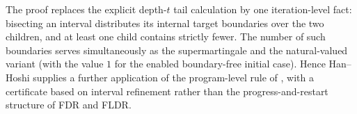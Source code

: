 The proof replaces the explicit depth-$t$ tail calculation by one
iteration-level fact: bisecting an interval distributes its internal
target boundaries over the two children, and at least one child contains
strictly fewer.  The number of such boundaries serves simultaneously as
the supermartingale and the natural-valued variant (with the value $1$
for the enabled boundary-free initial case).  Hence Han--Hoshi supplies a further application of the
program-level rule of , with a certificate based on
interval refinement rather than the progress-and-restart structure of
FDR and FLDR.
